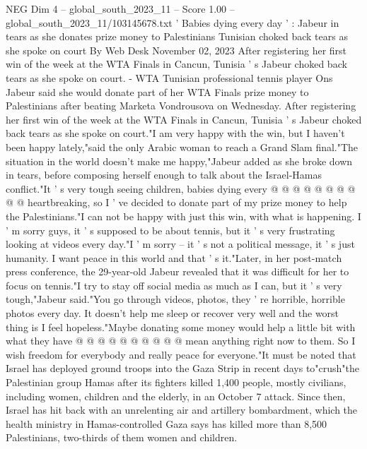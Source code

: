 \begin{textsample}{NEG Dim 4 – global\_south\_2023\_11 – Score 1.00 – global\_south\_2023\_11/103145678.txt}  \label{ex:f4_neg_299}
' Babies dying every day ' : Jabeur in tears as she donates prize money to Palestinians Tunisian choked back tears as she spoke on court By Web Desk November 02, 2023 After registering her first win of the week at the WTA Finals in Cancun, Tunisia ' s Jabeur choked back tears as she spoke on court. - WTA Tunisian professional tennis player Ons Jabeur said she would donate part of her WTA Finals prize money to Palestinians after beating Marketa Vondrousova on Wednesday.
After registering her first win of the week at the WTA Finals in Cancun, Tunisia ' s Jabeur choked back tears as she spoke on court."I am very happy with the win, but I haven't been happy lately,"said the only Arabic woman to reach a Grand Slam final."The situation in the world doesn't make me happy,"Jabeur added as she broke down in tears, before composing herself enough to talk about the Israel-Hamas conflict."It ' s very tough seeing children, babies dying every @ @ @ @ @ @ @ @ @ @ heartbreaking, so I ' ve decided to donate part of my prize money to help the Palestinians."I can not be happy with just this win, with what is happening.
I ' m sorry guys, it ' s supposed to be about tennis, but it ' s very frustrating looking at videos every day."I ' m sorry -- it ' s not a political message, it ' s just humanity.
I want peace in this world and that ' s it."Later, in her post-match press conference, the 29-year-old Jabeur revealed that it was difficult for her to focus on tennis."I try to stay off social media as much as I can, but it ' s very tough,"Jabeur said."You go through videos, photos, they ' re horrible, horrible photos every day.
It doesn't help me sleep or recover very well and the worst thing is I feel hopeless."Maybe donating some money would help a little bit with what they have @ @ @ @ @ @ @ @ @ @ mean anything right now to them.
So I wish freedom for everybody and really peace for everyone."It must be noted that Israel has deployed ground troops into the Gaza Strip in recent days to"crush"the Palestinian group Hamas after its fighters killed 1,400 people, mostly civilians, including women, children and the elderly, in an October 7 attack.
Since then, Israel has hit back with an unrelenting air and artillery bombardment, which the health ministry in Hamas-controlled Gaza says has killed more than 8,500 Palestinians, two-thirds of them women and children.

\end{textsample}
